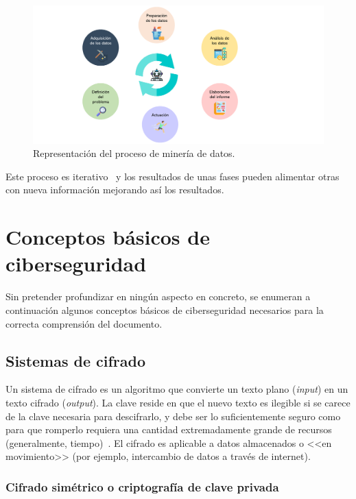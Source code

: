 \begin{figure}[h]
	\caption[Proceso de minería de datos: metodología]{Representación del proceso de minería de datos.}
	\label{img:proceso_mineria}
	\centering
	\includegraphics[scale=0.5]{../img/memoria/3_ML_phases.pdf}
\end{figure}


Este proceso es iterativo~\cite{apuntesMineria} y los resultados de unas fases pueden alimentar otras con nueva información mejorando así los resultados.


\section{Conceptos básicos de ciberseguridad}

Sin pretender profundizar en ningún aspecto en concreto, se enumeran a continuación algunos conceptos básicos de ciberseguridad necesarios para la correcta comprensión del documento.

\subsection{Sistemas de cifrado}

Un sistema de cifrado es un algoritmo que convierte un texto plano (\textit{input}) en un texto cifrado (\textit{output}). La clave reside en que el nuevo texto es ilegible si se carece de la clave necesaria para descifrarlo, y debe ser lo suficientemente seguro como para que romperlo requiera una cantidad extremadamente grande de recursos (generalmente, tiempo)~\cite{cifradoAvast}. El cifrado es aplicable a datos almacenados o <<en movimiento>> (por ejemplo, intercambio de datos a través de internet).

\subsubsection{Cifrado simétrico o criptografía de clave privada}


